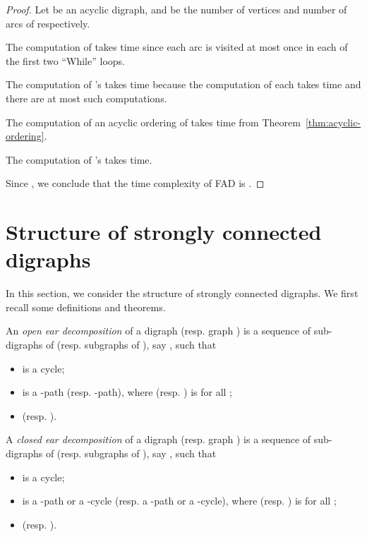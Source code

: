 \documentclass{article}
\begin{document}
\begin{proof}

Let  be an acyclic digraph,  and  be the number of vertices
and number of arcs of  respectively.

The computation of  takes  time since each arc is
visited at most once in each of the first two ``While'' loops.

The computation of 's takes  time because the
computation of each  takes  time and there are at most
 such computations.

The computation of an acyclic ordering of  takes
 time from Theorem~\ref{thm:acyclic-ordering}.

The computation of 's takes  time.

Since , we conclude that the time complexity of FAD is
.
\end{proof}


\section{Structure of strongly connected digraphs}\label{sec:strong-structure}

In this section, we consider the structure of strongly connected
digraphs. We first recall some definitions and theorems.

An \emph{open ear decomposition} of a digraph  (resp. graph
) is a sequence of sub-digraphs of  (resp. subgraphs of
), say , such that
\begin{itemize}

\item  is a cycle;

\item  is a -path (resp. -path), where  (resp. ) is  for all ;

\item  (resp. ).
\end{itemize}

A \emph{closed ear decomposition} of a digraph  (resp.
graph ) is a sequence of sub-digraphs of  (resp.
subgraphs of ), say , such that
\begin{itemize}

\item  is a cycle;

\item  is a -path or a -cycle (resp. a -path or a -cycle), where  (resp. ) is  for all ;

\item  (resp. ).
\end{itemize}
\end{document}
